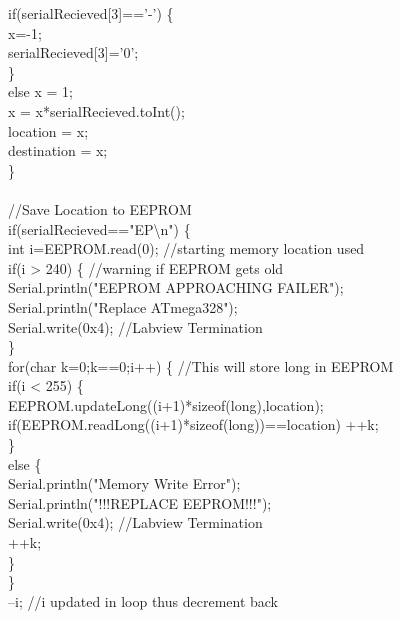 {{\tabto*{1cm}		if(serialRecieved[3]=='-') \{\\
\tabto*{1.5cm}			x=-1;\\
\tabto*{1.5cm}			serialRecieved[3]='0';\\
\tabto*{1cm}		\}\\
\tabto*{1cm}		else x = 1;\\		
\tabto*{1cm}		x = x*serialRecieved.toInt();\\
\tabto*{1cm}		location = x;\\
\tabto*{1cm}		destination = x;\\		
\tabto*{.5cm}	\}\\
\\
\tabto*{.5cm}//Save Location to EEPROM\\
\tabto*{.5cm}if(serialRecieved=="EP\textbackslash n") \{  \\
\tabto*{1cm}	int i=EEPROM.read(0); \tabto*{7.5cm} //starting memory location used\\
\tabto*{1.5cm}	if(i > 240) \{ \tabto*{7.5cm} //warning if EEPROM gets old\\
\tabto*{1.5cm}		Serial.println("EEPROM APPROACHING FAILER");\\
\tabto*{1.5cm}		Serial.println("Replace ATmega328");\\
\tabto*{1.5cm}		Serial.write(0x4);  //Labview Termination\\
\tabto*{1cm}	\}\\	
\tabto*{1cm}	for(char k=0;k==0;i++) \{  \tabto*{7.5cm}//This will store long in  EEPROM \\
\tabto*{1.5cm}		if(i < 255) \{\\
\tabto*{2cm}			EEPROM.updateLong((i+1)*sizeof(long),location);  \\
\tabto*{2cm}			if(EEPROM.readLong((i+1)*sizeof(long))==location) ++k;\\
\tabto*{1.5cm}		\}\\
\tabto*{1.5cm}		else \{\\
\tabto*{2cm}			Serial.println("Memory Write Error");\\
\tabto*{2cm}			Serial.println("!!!REPLACE EEPROM!!!");\\
\tabto*{2cm}			Serial.write(0x4); \tabto*{7.5cm} //Labview Termination\\
\tabto*{2cm}			++k;\\
\tabto*{1.5cm}		\}\\
\tabto*{1cm}	\}\\
\tabto*{1cm}	--i;\tabto*{7.5cm}  //i updated in loop thus decrement back\\
}}
